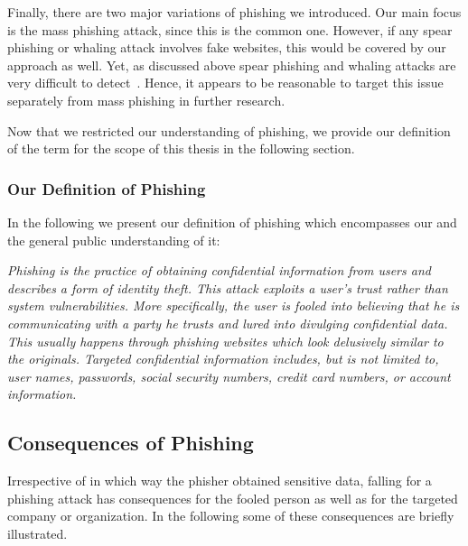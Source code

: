  Finally, there are two major variations of phishing we introduced.
 Our main focus is the mass phishing attack, since this is the common one.
 However, if any spear phishing or whaling attack involves fake websites, this would be covered by our approach as well.
Yet, as discussed above spear phishing and whaling attacks are very difficult to detect~\cite{trendlabs2012spear,statephishinghong}.
Hence, it appears to be reasonable to target this issue separately from mass phishing in further research.

Now that we restricted our understanding of phishing, we provide our definition of the term for the scope of this thesis in the following section.

\subsubsection{Our Definition of Phishing}
In the following we present our definition of phishing which encompasses our and the general public understanding of it:

\begin{center}
\textit{Phishing is the practice of obtaining confidential information from users and describes a form of identity theft. This attack exploits a user's trust rather than system vulnerabilities. More specifically, the user is fooled into believing that he is communicating with a party he trusts and lured into divulging confidential data. This usually happens through phishing websites which look delusively similar to the originals. Targeted confidential information includes, but is not limited to, user names, passwords, social security numbers, credit card numbers, or account information.}~\cite{jakobsson2006phishing}
\end{center}

\subsection{Consequences of Phishing}
Irrespective of in which way the phisher obtained sensitive data, falling for a phishing attack has consequences for the fooled person as well as for the targeted company or organization.
In the following some of these consequences are briefly illustrated.

